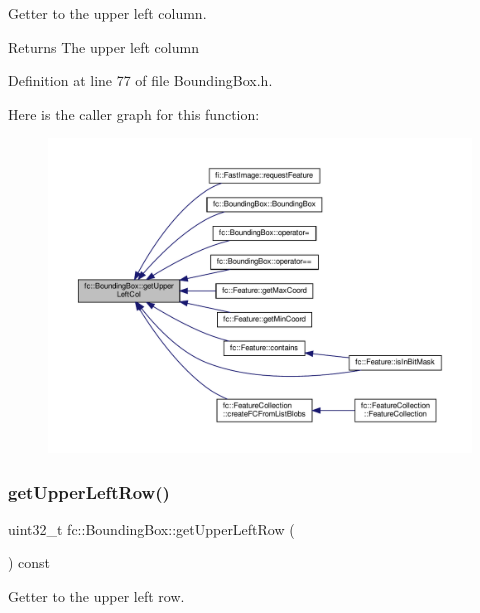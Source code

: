 Getter to the upper left column. 

\begin{DoxyReturn}{Returns}
The upper left column 
\end{DoxyReturn}


Definition at line 77 of file Bounding\+Box.\+h.

Here is the caller graph for this function\+:
\nopagebreak
\begin{figure}[H]
\begin{center}
\leavevmode
\includegraphics[width=350pt]{db/dc1/classfc_1_1BoundingBox_a21e8dcad0b3d37aa0a37c6dab4200974_icgraph}
\end{center}
\end{figure}
\mbox{\label{classfc_1_1BoundingBox_a921418d145cc148a50d599b51447215a}} 
\subsubsection{\texorpdfstring{get\+Upper\+Left\+Row()}{getUpperLeftRow()}}
{\footnotesize\ttfamily uint32\+\_\+t fc\+::\+Bounding\+Box\+::get\+Upper\+Left\+Row (\begin{DoxyParamCaption}{ }\end{DoxyParamCaption}) const\hspace{0.3cm}{\ttfamily [inline]}}



Getter to the upper left row. 

